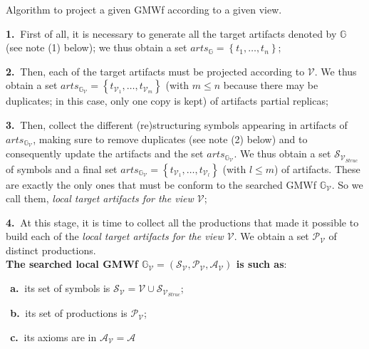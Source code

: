 \begin{algorithm}
\small
\caption{Algorithm to project a given GMWf according to a given view.}
\label{chap3:algo:gmwf-projection}
\begin{mdframed}[style=MyFrame]
	
	\noindent\textbf{1.}$~$ First of all, it is necessary to generate all the target artifacts denoted by $\mathbb{G}$ (see note (1) below); 
	we thus obtain a set $arts_{\mathbb{G}}=\left\{t_1,\ldots,t_n\right\}$;
	
	\noindent\textbf{2.}$~$ Then, each of the target artifacts must be projected according to $\mathcal{V}$. We thus obtain a set $arts_{\mathbb{G}_{\mathcal{V}}} = \left\{t_{\mathcal{V}_1},\ldots,t_{\mathcal{V}_m}\right\}$ (with $m \leq n$ because there may be duplicates; %
	in this case, only one copy is kept) of artifacts partial replicas;
	
	\noindent\textbf{3.}$~$ Then, collect the different (re)structuring symbols appearing in artifacts of $arts_{\mathbb{G}_{\mathcal{V}}}$, making sure to remove duplicates (see note (2) below) 
	and to consequently update the artifacts and the set $arts_{\mathbb{G}_{\mathcal{V}}}$. We thus obtain a set $\mathcal{S}_{\mathcal{V}_{Struc}}$ of symbols and a final set $arts_{\mathbb{G}_{\mathcal{V}}} = \left\{t_{\mathcal{V}_1},\ldots,t_{\mathcal{V}_l}\right\}$ (with $l \leq m$) of artifacts. These are exactly the only ones that must be conform to the searched GMWf $\mathbb{G}_{\mathcal{V}}$. So we call them, \textit{local target artifacts for the view $\mathcal{V}$};
	
	\noindent\textbf{4.}$~$ At this stage, it is time to collect all the productions that made it possible to build each of the \textit{local target artifacts for the view $\mathcal{V}$}. We obtain a set $\mathcal{P}_{\mathcal{V}}$ of distinct productions.\\
	\textbf{The searched local GMWf $\mathbb{G}_{\mathcal{V}} = \left(\mathcal{S}_{\mathcal{V}},\mathcal{P}_{\mathcal{V}}, \mathcal{A}_{\mathcal{V}}\right)$ is such as}:
	
	$~~$\textbf{a.}$~$ its set of symbols is $\mathcal{S}_{\mathcal{V}} = \mathcal{V} \cup \mathcal{S}_{\mathcal{V}_{Struc}}$;
	
	$~~$\textbf{b.}$~$ its set of productions is $\mathcal{P}_{\mathcal{V}}$;
	
	$~~$\textbf{c.}$~$ its axioms are in $\mathcal{A}_{\mathcal{V}} = \mathcal{A}$
	

\end{mdframed}
\end{algorithm}
